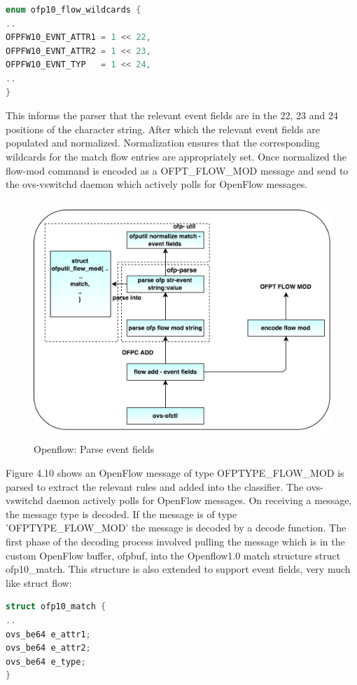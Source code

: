 \begin{lstlisting}[language=c]
enum ofp10_flow_wildcards {
..
OFPFW10_EVNT_ATTR1 = 1 << 22,
OFPFW10_EVNT_ATTR2 = 1 << 23,
OFPFW10_EVNT_TYP   = 1 << 24,
..
}
\end{lstlisting}
This informs the parser that the relevant event fields are in the 22, 23 and 24 positions of the character string. After which the relevant event fields are populated and normalized. Normalization ensures that the corresponding wildcards for the match flow entries are appropriately set. Once normalized the flow-mod command is encoded as a OFPT_FLOW_MOD message and send to the ovs-vswitchd daemon which actively polls for OpenFlow messages.

\begin{figure}[H]
 \centering
 \caption{Openflow: Parse event fields}
 \includegraphics[height=9cm]{flowadd01.pdf}
\end{figure}

Figure 4.10 shows an OpenFlow message of type OFPTYPE_FLOW_MOD is parsed to extract the relevant rules and added into the classifier. The ovs-vswitchd daemon actively polls for OpenFlow messages. On receiving a message, the message type is decoded. If the message is of type 'OFPTYPE_FLOW_MOD' the message is decoded by a decode function. The first phase of the decoding process involved pulling the message which is in the custom OpenFlow buffer, ofpbuf, into the Openflow1.0 match structure struct ofp10_match. This structure is also extended to support event fields, very much like struct flow: \newline

\begin{lstlisting}[language=c]
struct ofp10_match {
..
ovs_be64 e_attr1;
ovs_be64 e_attr2;
ovs_be64 e_type;
}
\end{lstlisting}

